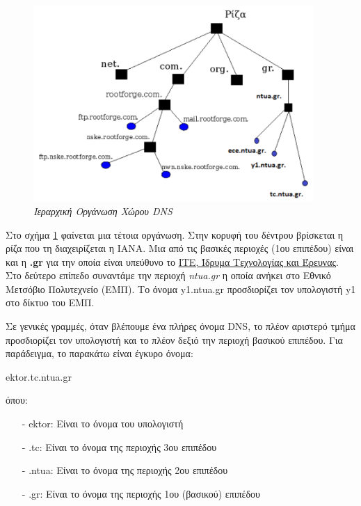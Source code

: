 \begin{figure}[!ht]
  \centering
  \includegraphics[width=0.95\textwidth]{images/chapter6/6-2}
  \caption {\textsl{Ιεραρχική Οργάνωση Χώρου DNS}}
  \label{6-2}
\end{figure}

Στο σχήμα \ref{6-2} φαίνεται μια τέτοια οργάνωση. Στην κορυφή του δέντρου βρίσκεται η ρίζα που τη διαχειρίζεται η ΙΑΝΑ. Μια από τις βασικές περιοχές (1ου επιπέδου) είναι και η \textbf{.gr} για την οποία είναι υπεύθυνο το \href{https://grweb.ics.forth.gr/public/}{ΙΤΕ, Ίδρυμα Τεχνολογίας και Έρευνας}. Στο δεύτερο επίπεδο συναντάμε την περιοχή \emph{ntua.gr} η οποία ανήκει στο Εθνικό Μετσόβιο Πολυτεχνείο (ΕΜΠ). Το όνομα y1.ntua.gr προσδιορίζει τον υπολογιστή y1 στο δίκτυο του ΕΜΠ.

Σε γενικές γραμμές, όταν βλέπουμε ένα πλήρες όνομα DNS, το πλέον αριστερό τμήμα προσδιορίζει τον υπολογιστή και το πλέον δεξιό την περιοχή βασικού επιπέδου. Για παράδειγμα, το παρακάτω είναι έγκυρο όνομα:

\begin{center}
ektor.tc.ntua.gr
\end{center}

όπου:

\begin{itemize}
\item[-]ektor: Είναι το όνομα του υπολογιστή
\item[-].tc: Είναι το όνομα της περιοχής 3ου επιπέδου
\item[-].ntua: Είναι το όνομα της περιοχής 2ου επιπέδου
\item[-].gr: Είναι το όνομα της περιοχής 1ου (βασικού) επιπέδου
\end{itemize}

